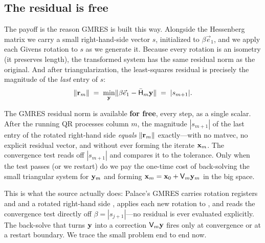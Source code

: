 \subsection{The residual is free}

The payoff is the reason GMRES is built this way. Alongside the Hessenberg matrix we
carry a small right-hand-side vector $s$, initialized to $\beta\vec e_1$, and we
apply each Givens rotation to $s$ as we generate it. Because every rotation is an
isometry (it preserves length), the transformed system has the same residual norm as
the original. And after triangularization, the least-squares residual is precisely
the magnitude of the \emph{last} entry of $s$:
\[
  \lVert\mathbf{r}_m\rVert\;=\;\min_{\mathbf{y}}\lVert\beta\vec e_1-\bar{\mathsf{H}}_m\mathbf{y}\rVert\;=\;\lvert s_{m+1}\rvert.
\]

\begin{keyidea}
The GMRES residual norm is available \textbf{for free}, every step, as a single
scalar. After the running QR processes column $m$, the magnitude $|s_{m+1}|$ of the
last entry of the rotated right-hand side \emph{equals} $\lVert\mathbf{r}_m\rVert$
exactly---with no matvec, no explicit residual vector, and without ever forming the
iterate $\mathbf{x}_m$. The convergence test reads off $|s_{m+1}|$ and compares it to the
tolerance. Only when the test passes (or we restart) do we pay the one-time cost of
back-solving the small triangular system for $\mathbf{y}_m$ and forming
$\mathbf{x}_m=\mathbf{x}_0+\mathsf{V}_m\mathbf{y}_m$ in the big space.
\end{keyidea}

This is what the source actually does: Palace's GMRES carries rotation registers
 and  and a rotated right-hand side , applies each new
rotation to , and reads the convergence test directly off
$\beta=|s_{j+1}|$---no residual is ever evaluated explicitly. The back-solve that
turns $\mathbf{y}$ into a correction $\mathsf{V}_m\mathbf{y}$ fires only at convergence or at a
restart boundary. We trace the small problem end to end now.


